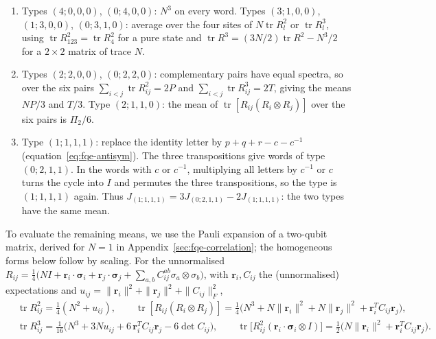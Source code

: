 \begin{enumerate}
\item[(a)] Types \((4;0,0,0)\), \((0;4,0,0)\): \(N^3\) on every word. Types \((3;1,0,0)\), \((1;3,0,0)\), \((0;3,1,0)\):
average over the four sites of \(N\operatorname{tr}R_l^2\) or \(\operatorname{tr}R_l^3\), using
\(\operatorname{tr}R_{123}^2=\operatorname{tr}R_4^2\) for a pure state and
\(\operatorname{tr}R^3=(3N/2)\operatorname{tr}R^2-N^3/2\) for a \(2\times2\) matrix of trace \(N\).
\item[(b)] Types \((2;2,0,0)\), \((0;2,2,0)\): complementary pairs have equal spectra, so over the six pairs
\(\sum_{i<j}\operatorname{tr}R_{ij}^2=2P\) and \(\sum_{i<j}\operatorname{tr}R_{ij}^3=2T\), giving the means
\(NP/3\) and \(T/3\). Type \((2;1,1,0)\): the mean of \(\operatorname{tr}[R_{ij}(R_i\otimes R_j)]\) over the six pairs is \(\Pi_2/6\).
\item[(c)] Type \((1;1,1,1)\): replace the identity letter by \(p+q+r-c-c^{-1}\) (equation~\eqref{eq:fqe-antisym}).
The three transpositions give words of type \((0;2,1,1)\). In the words with \(c\) or \(c^{-1}\), multiplying all letters
by \(c^{-1}\) or \(c\) turns the cycle into \(I\) and permutes the three transpositions, so the type is \((1;1,1,1)\) again.
Thus \(J_{(1;1,1,1)}=3J_{(0;2,1,1)}-2J_{(1;1,1,1)}\): the two types have the same mean.
\end{enumerate}
To evaluate the remaining means, we use the Pauli expansion of a two-qubit matrix, derived for $N=1$ in
Appendix~\ref{sec:fqe-correlation}; the homogeneous forms below follow by scaling.
For the unnormalised \(R_{ij}=\frac14\bigl(NI+\mathbf r_i\!\cdot\!\boldsymbol\sigma_i+\mathbf r_j\!\cdot\!\boldsymbol\sigma_j
+\sum_{a,b}C^{ab}_{ij}\sigma_a\otimes\sigma_b\bigr)\), with \(\mathbf r_i,C_{ij}\) the (unnormalised) expectations
and \(u_{ij}=\|\mathbf r_i\|^2+\|\mathbf r_j\|^2+\|C_{ij}\|_F^2\), \[
\begin{aligned}
&\operatorname{tr}R_{ij}^2=\tfrac14(N^2+u_{ij}),\qquad
\operatorname{tr}[R_{ij}(R_i\otimes R_j)]=\tfrac14\bigl(N^3+N\|\mathbf r_i\|^2+N\|\mathbf r_j\|^2+\mathbf r_i^TC_{ij}\mathbf r_j\bigr),\\
&\operatorname{tr}R_{ij}^3=\tfrac1{16}\bigl(N^3+3Nu_{ij}+6\,\mathbf r_i^TC_{ij}\mathbf r_j-6\det C_{ij}\bigr),\qquad
\operatorname{tr}\bigl[R_{ij}^2(\mathbf r_i\!\cdot\!\boldsymbol\sigma_i\otimes I)\bigr]=\tfrac12\bigl(N\|\mathbf r_i\|^2+\mathbf r_i^TC_{ij}\mathbf r_j\bigr).
\end{aligned}
\]
